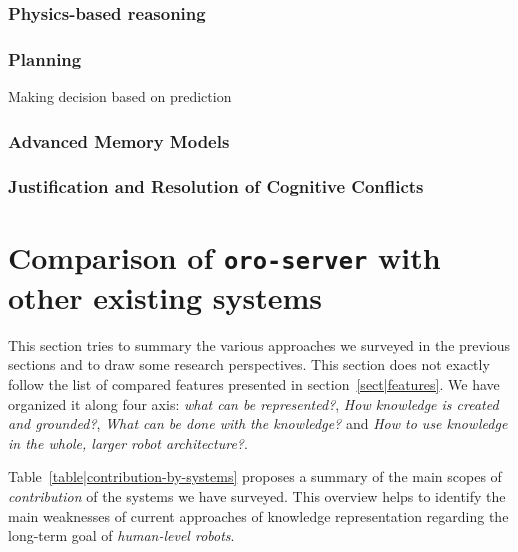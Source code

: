 \subsubsection{Physics-based reasoning}
\subsubsection{Planning}
Making decision based on prediction

\subsubsection{Advanced Memory Models}


\subsubsection{Justification and Resolution of Cognitive Conflicts}

\section{Comparison of {\tt oro-server} with other existing systems}
\label{sect|evaluation-oroserver}

This section tries to summary the various approaches we surveyed in the
previous sections and to draw some research perspectives. This section does not
exactly follow the list of compared features presented in
section~\ref{sect|features}. We have organized it along four axis: \emph{what
can be represented?}, \emph{How knowledge is created and grounded?}, \emph{What
can be done with the knowledge?} and \emph{How to use knowledge in the whole,
larger robot architecture?}.

Table~\ref{table|contribution-by-systems} proposes a summary of the main scopes
of \emph{contribution} of the systems we have surveyed. This overview helps to
identify the main weaknesses of current approaches of knowledge representation
regarding the long-term goal of \emph{human-level robots}.

